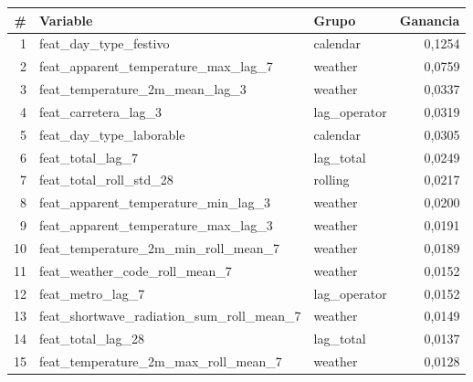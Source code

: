 \begin{tabular}{rllr}
\toprule
\rowcolor{naranja}
\textbf{\#} & \textbf{Variable} & \textbf{Grupo} & \textbf{Ganancia} \\
\midrule
\rowcolor{filaclara} 1 & feat\_\allowbreak{}day\_\allowbreak{}type\_\allowbreak{}festivo & calendar & 0,1254 \\
2 & feat\_\allowbreak{}apparent\_\allowbreak{}temperature\_\allowbreak{}max\_\allowbreak{}lag\_\allowbreak{}7 & weather & 0,0759 \\
\rowcolor{filaclara} 3 & feat\_\allowbreak{}temperature\_\allowbreak{}2m\_\allowbreak{}mean\_\allowbreak{}lag\_\allowbreak{}3 & weather & 0,0337 \\
4 & feat\_\allowbreak{}carretera\_\allowbreak{}lag\_\allowbreak{}3 & lag\_\allowbreak{}operator & 0,0319 \\
\rowcolor{filaclara} 5 & feat\_\allowbreak{}day\_\allowbreak{}type\_\allowbreak{}laborable & calendar & 0,0305 \\
6 & feat\_\allowbreak{}total\_\allowbreak{}lag\_\allowbreak{}7 & lag\_\allowbreak{}total & 0,0249 \\
\rowcolor{filaclara} 7 & feat\_\allowbreak{}total\_\allowbreak{}roll\_\allowbreak{}std\_\allowbreak{}28 & rolling & 0,0217 \\
8 & feat\_\allowbreak{}apparent\_\allowbreak{}temperature\_\allowbreak{}min\_\allowbreak{}lag\_\allowbreak{}3 & weather & 0,0200 \\
\rowcolor{filaclara} 9 & feat\_\allowbreak{}apparent\_\allowbreak{}temperature\_\allowbreak{}max\_\allowbreak{}lag\_\allowbreak{}3 & weather & 0,0191 \\
10 & feat\_\allowbreak{}temperature\_\allowbreak{}2m\_\allowbreak{}min\_\allowbreak{}roll\_\allowbreak{}mean\_\allowbreak{}7 & weather & 0,0189 \\
\rowcolor{filaclara} 11 & feat\_\allowbreak{}weather\_\allowbreak{}code\_\allowbreak{}roll\_\allowbreak{}mean\_\allowbreak{}7 & weather & 0,0152 \\
12 & feat\_\allowbreak{}metro\_\allowbreak{}lag\_\allowbreak{}7 & lag\_\allowbreak{}operator & 0,0152 \\
\rowcolor{filaclara} 13 & feat\_\allowbreak{}shortwave\_\allowbreak{}radiation\_\allowbreak{}sum\_\allowbreak{}roll\_\allowbreak{}mean\_\allowbreak{}7 & weather & 0,0149 \\
14 & feat\_\allowbreak{}total\_\allowbreak{}lag\_\allowbreak{}28 & lag\_\allowbreak{}total & 0,0137 \\
\rowcolor{filaclara} 15 & feat\_\allowbreak{}temperature\_\allowbreak{}2m\_\allowbreak{}max\_\allowbreak{}roll\_\allowbreak{}mean\_\allowbreak{}7 & weather & 0,0128 \\
\bottomrule
\end{tabular}
